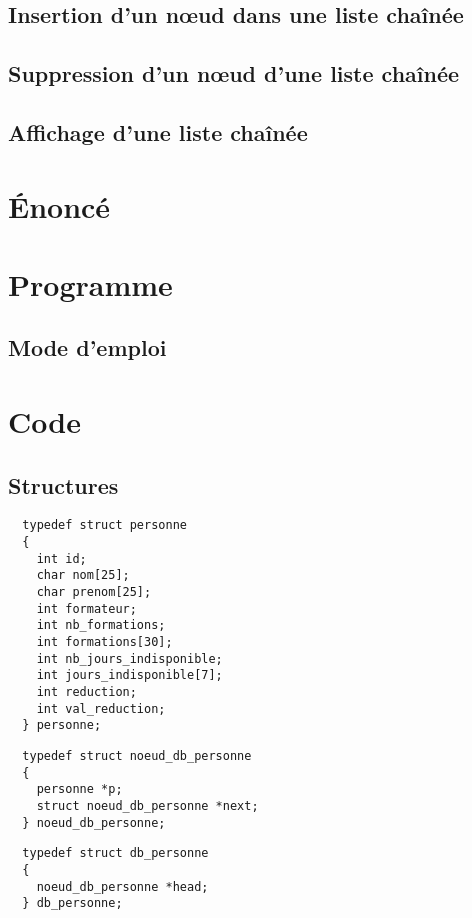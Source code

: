 \documentclass[11pt]{article}
\begin{document}
\subsection{Insertion d'un n\oe{}ud dans une liste chaînée}
\subsection{Suppression d'un n\oe{}ud d'une liste chaînée}
\subsection{Affichage d'une liste chaînée}

\newpage
\section{Énoncé}

\newpage
\section{Programme}
\subsection{Mode d'emploi}

\newpage
\section{Code}
\subsection{Structures}

\begin{lstlisting}
  typedef struct personne
  {
    int id;
    char nom[25];
    char prenom[25];
    int formateur;
    int nb_formations;
    int formations[30];
    int nb_jours_indisponible;
    int jours_indisponible[7];
    int reduction;
    int val_reduction;
  } personne;
\end{lstlisting}

\begin{lstlisting}
  typedef struct noeud_db_personne
  {
    personne *p;
    struct noeud_db_personne *next;
  } noeud_db_personne;
\end{lstlisting}

\begin{lstlisting}
  typedef struct db_personne
  {
    noeud_db_personne *head;
  } db_personne;
\end{lstlisting}
\end{document}
